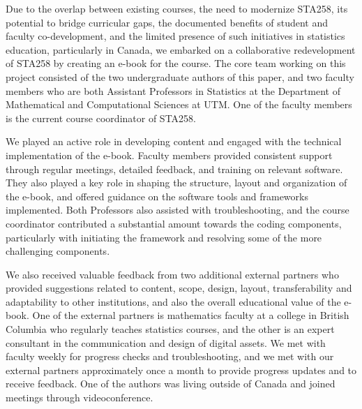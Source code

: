 \documentclass[11pt]{article}
\begin{document}

Due to the overlap between existing courses, the need to modernize STA258, its potential to bridge curricular gaps, the documented benefits of student and faculty co-development, and the limited presence of such initiatives in statistics education, particularly in Canada, we embarked on a collaborative redevelopment of STA258 by creating an e-book for the course.
The core team working on this project consisted of the two undergraduate authors of this paper, and two faculty members who are both Assistant Professors in Statistics at the Department of Mathematical and Computational Sciences at UTM. One of the faculty members is the current course coordinator of STA258.

We played an active role in developing content and engaged with the technical implementation of the e-book.
Faculty members provided consistent support through regular meetings, detailed feedback, and training on relevant software. 
They also played a key role in shaping the structure, layout and organization of the e-book, and offered guidance on the software tools and frameworks implemented.
Both Professors also assisted with troubleshooting, and the course coordinator contributed a substantial amount towards the coding components, particularly with initiating the framework and resolving some of the more challenging components.

We also received valuable feedback from two additional external partners 
who provided suggestions related to content, scope, design, layout, transferability and adaptability to other institutions, and also the overall educational value of the e-book.
One of the external partners is mathematics faculty at a college in British Columbia who regularly teaches statistics courses, and the other is an expert consultant in the communication and design of digital assets.
We met with faculty weekly for progress checks and troubleshooting, and we met with our external partners approximately once a month to provide progress updates and to receive feedback.
One of the authors was living outside of Canada and joined meetings through videoconference.
\end{document}
